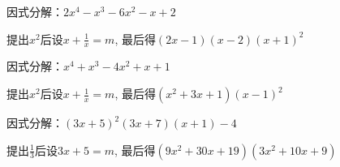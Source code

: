 \documentclass[windows,csize4]{BHCexam}
\begin{document}
\begin{groups}
\begin{questions}[]
        \question[5] 因式分解：$2x^4-x^3-6x^2-x+2$
        \begin{solution}{0.5cm}
            \methodonly 提出$x^2$后设$x+\frac{1}{x}=m$, 最后得$(2x-1)(x-2)(x+1)^2$
        \end{solution}
        \vspace{3.5cm}

        \question[5] 因式分解：$x^4+x^3-4x^2+x+1$
        \begin{solution}{0.5cm}
            \methodonly 提出$x^2$后设$x+\frac{1}{x}=m$, 最后得$(x^2+3x+1)(x-1)^2$
        \end{solution}
        \vspace{3.5cm}

        \question[5] 因式分解：$(3x+5)^2(3x+7)(x+1)-4$
        \begin{solution}{0.5cm}
            \methodonly 提出$\frac{1}{3}$后设$3x+5=m$, 最后得$(9x^2+30x+19)(3x^2+10x+9)$
        \end{solution}

    \end{questions}

\end{groups}


\label{lastpage}
\end{document}
